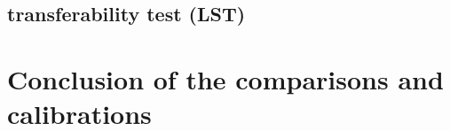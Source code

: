 
\subsection{transferability test (LST)}


\section{Conclusion of the comparisons and calibrations}









